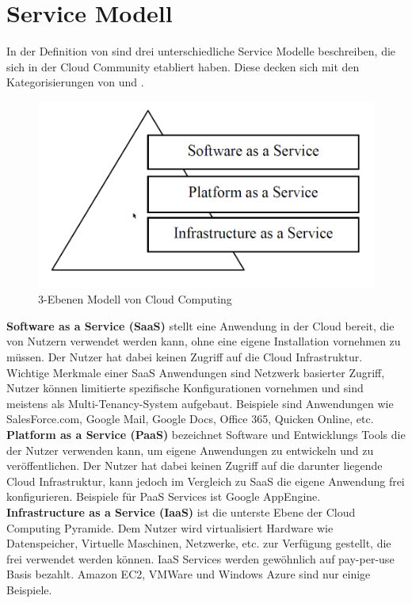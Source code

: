 \section{Service Modell}
In der Definition von \cite*[S.2]{Mell.2011} sind drei unterschiedliche Service Modelle beschreiben, die sich in der Cloud Community etabliert haben. Diese decken sich mit den Kategorisierungen von \cite[S. 28]{Tharam.2010} und \cite[S. 878]{Jadeja.2012}.

	\begin{figure}[h]
		\centering
		\includegraphics[width=0.7\linewidth]{images/cloud_computing_pyramide}
		\caption{3-Ebenen Modell von Cloud Computing}
		\label{fig:CloudComputingPyramide}
	\end{figure}


\textbf{Software as a Service (SaaS)} stellt eine Anwendung in der Cloud bereit, die von Nutzern verwendet werden kann, ohne eine eigene Installation vornehmen zu müssen. Der Nutzer hat dabei keinen Zugriff auf die Cloud Infrastruktur. Wichtige Merkmale einer SaaS Anwendungen sind Netzwerk basierter Zugriff, Nutzer können limitierte spezifische Konfigurationen vornehmen und sind meistens als Multi-Tenancy-System aufgebaut. Beispiele sind Anwendungen wie SalesForce.com, Google Mail, Google Docs, Office 365, Quicken Online, etc.
\\

\textbf{Platform as a Service (PaaS)} bezeichnet Software und Entwicklungs Tools die der Nutzer verwenden kann, um eigene Anwendungen zu entwickeln und zu veröffentlichen. Der Nutzer hat dabei keinen Zugriff auf die darunter liegende Cloud Infrastruktur, kann jedoch im Vergleich zu SaaS die eigene Anwendung frei konfigurieren. Beispiele für PaaS Services ist Google AppEngine.
\\

\textbf{Infrastructure as a Service (IaaS)} ist die unterste Ebene der Cloud Computing Pyramide. Dem Nutzer wird virtualisiert Hardware wie Datenspeicher, Virtuelle Maschinen, Netzwerke, etc. zur Verfügung gestellt, die frei verwendet werden können. IaaS Services werden gewöhnlich auf pay-per-use Basis bezahlt. Amazon EC2, VMWare und Windows Azure sind nur einige Beispiele.
\\

